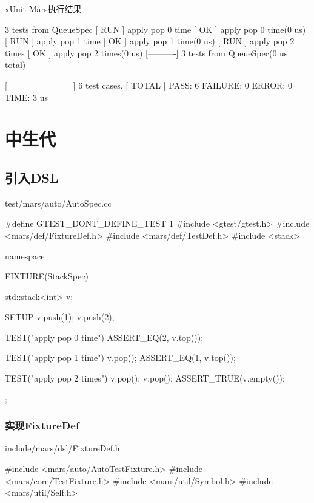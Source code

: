 \begin{content}
\begin{nodiff}{xUnit Mars执行结果}
\begin{c++}
[----------] 3 tests from QueueSpec
[ RUN      ] apply pop 0 time
[       OK ] apply pop 0 time(0 us)
[ RUN      ] apply pop 1 time
[       OK ] apply pop 1 time(0 us)
[ RUN      ] apply pop 2 times
[       OK ] apply pop 2 times(0 us)
[----------] 3 tests from QueueSpec(0 us total)

[==========] 6 test cases.
[  TOTAL   ] PASS: 6  FAILURE: 0  ERROR: 0  TIME: 3 us
 \end{c++}
\end{nodiff}

\end{content}

\section{中生代}

\begin{content}

\subsection{引入DSL}

\begin{nodiff}{test/mars/auto/AutoSpec.cc}
 \begin{c++}
#define GTEST_DONT_DEFINE_TEST 1
#include <gtest/gtest.h>
#include <mars/def/FixtureDef.h>
#include <mars/def/TestDef.h>
#include <stack>

namespace {
  FIXTURE(StackSpec) {
    std::stack<int> v;

    SETUP {
      v.push(1);
      v.push(2);
    }

    TEST("apply pop 0 time") {
      ASSERT_EQ(2, v.top());
    }

    TEST("apply pop 1 time") {
      v.pop();
      ASSERT_EQ(1, v.top());
    }

    TEST("apply pop 2 times") {
      v.pop();
      v.pop();
      ASSERT_TRUE(v.empty());
    }
  };
}
 \end{c++}
\end{nodiff}

\subsubsection{实现FixtureDef}

\begin{nodiff}{include/mars/dsl/FixtureDef.h}
 \begin{c++}
#include <mars/auto/AutoTestFixture.h>
#include <mars/core/TestFixture.h>
#include <mars/util/Symbol.h>
#include <mars/util/Self.h>


\end{c++}
\end{nodiff}
\end{content}
